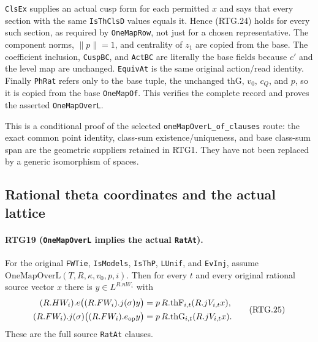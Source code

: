 \texttt{ClsEx} supplies an actual cusp form for each permitted $x$ and
says that every section with the same \texttt{IsThClsD} values equals
it.  Hence (RTG.24) holds for every such section, as required by
\texttt{OneMapRow}, not just for a chosen representative.  The component
norms, $\lVert p\rVert=1$, and centrality of $z_1$ are copied from the
base.  The coefficient inclusion, \texttt{CuspBC}, and \texttt{ActBC}
are literally the base fields because $c'$ and the level map are
unchanged.  \texttt{EquivAt} is the same original action/read identity.
Finally \texttt{PhRat} refers only to the base tuple, the unchanged
$\mathrm{thG}$, $v_0$, $c_Q$, and $p$, so it is copied from the base
\texttt{OneMapOf}.  This verifies the complete record and proves the
asserted \texttt{OneMapOverL}.

This is a conditional proof of the selected
\texttt{oneMapOverL\_\allowbreak of\_\allowbreak clauses} route: the exact common point identity,
class-sum existence/uniqueness, and base class-sum span are the geometric
suppliers retained in RTG1.  They have not been replaced by a generic
isomorphism of spaces.

\subsection{Rational theta coordinates and the actual lattice}

\paragraph{RTG19 (\texttt{OneMapOverL} implies the actual \texttt{RatAt}).}
\label{claim:RTG19}
For the original \texttt{FWTie}, \texttt{IsModels}, \texttt{IsThP},
\texttt{LUnif}, and \texttt{EvInj}, assume
\(\mathrm{OneMapOverL}(T,R,\kappa,v_0,p,i)\).
Then for every $t$ and every original rational source vector $x$
there is $y\in L^{R.nW_i}$ with
\[
 \begin{split}
 (R.HW_i).e\bigl((R.FW_i).j(\sigma)y\bigr)
      &=p\,R.\mathrm{thF}_{i,t}(R.jV_{i,t}x),\\
 (R.FW_i).j(\sigma)\bigl((R.FW_i).e_{\rm op}y\bigr)
      &=p\,R.\mathrm{thG}_{i,t}(R.jV_{i,t}x).
 \end{split}                                                  \tag{RTG.25}
\]
These are the full source \texttt{RatAt} clauses.

